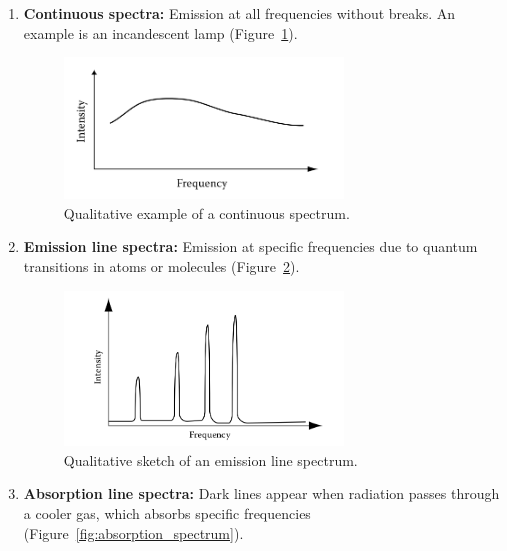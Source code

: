 \begin{enumerate}
    \item \textbf{Continuous spectra:} Emission at all frequencies without breaks. An example is an incandescent lamp (Figure~\ref{fig:continuous_spectrum}).

    \begin{figure}[H]
        \centering
        \includegraphics[width=0.7\textwidth]{Images/continuous_spectrum.png}
        \caption{Qualitative example of a continuous spectrum.}
        \label{fig:continuous_spectrum}
    \end{figure}

    \item \textbf{Emission line spectra:} Emission at specific frequencies due to quantum transitions in atoms or molecules (Figure~\ref{fig:emission_spectrum}).

    \begin{figure}[H]
        \centering
        \includegraphics[width=0.7\textwidth]{Images/emission_spectrum.png}
        \caption{Qualitative sketch of an emission line spectrum.}
        \label{fig:emission_spectrum}
    \end{figure}

    \item \textbf{Absorption line spectra:} Dark lines appear when radiation passes through a cooler gas, which absorbs specific frequencies (Figure~\ref{fig:absorption_spectrum}).


\end{enumerate}
